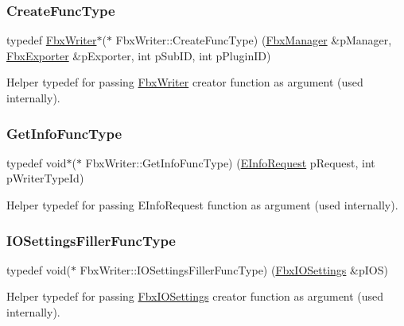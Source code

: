\subsubsection{\texorpdfstring{Create\+Func\+Type}{CreateFuncType}}
{\footnotesize\ttfamily typedef \hyperlink{class_fbx_writer}{Fbx\+Writer}$\ast$($\ast$ Fbx\+Writer\+::\+Create\+Func\+Type) (\hyperlink{class_fbx_manager}{Fbx\+Manager} \&p\+Manager, \hyperlink{class_fbx_exporter}{Fbx\+Exporter} \&p\+Exporter, int p\+Sub\+ID, int p\+Plugin\+ID)}



Helper typedef for passing \hyperlink{class_fbx_writer}{Fbx\+Writer} creator function as argument (used internally). 

\mbox{\label{class_fbx_writer_a6c13529045946d474e1e69fa0a6b9305}} 
\subsubsection{\texorpdfstring{Get\+Info\+Func\+Type}{GetInfoFuncType}}
{\footnotesize\ttfamily typedef void$\ast$($\ast$ Fbx\+Writer\+::\+Get\+Info\+Func\+Type) (\hyperlink{class_fbx_writer_a250cda8a59afd8e6be01c89cdd914e2a}{E\+Info\+Request} p\+Request, int p\+Writer\+Type\+Id)}



Helper typedef for passing E\+Info\+Request function as argument (used internally). 

\mbox{\label{class_fbx_writer_a43eb86f1aae1a6a424c54bcf294553c5}} 
\subsubsection{\texorpdfstring{I\+O\+Settings\+Filler\+Func\+Type}{IOSettingsFillerFuncType}}
{\footnotesize\ttfamily typedef void($\ast$ Fbx\+Writer\+::\+I\+O\+Settings\+Filler\+Func\+Type) (\hyperlink{class_fbx_i_o_settings}{Fbx\+I\+O\+Settings} \&p\+I\+OS)}



Helper typedef for passing \hyperlink{class_fbx_i_o_settings}{Fbx\+I\+O\+Settings} creator function as argument (used internally). 



